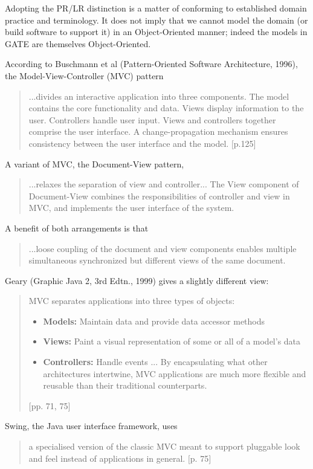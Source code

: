 Adopting the PR/LR distinction is a matter of conforming to established domain
practice and terminology. It does not imply that we cannot model the domain (or
build software to support it) in an Object-Oriented manner; indeed the models
in GATE are themselves Object-Oriented.


According to Buschmann et al
(Pattern-Oriented Software Architecture, 1996),
the Model-View-Controller (MVC)
pattern 
\begin{quotation} 
...divides an interactive application into three components. The model
contains the core functionality and data. Views display information to the
user. Controllers handle user input. Views and controllers together comprise
the user interface. A change-propagation mechanism ensures consistency between
the user interface and the model. \mbox{$[$}p.125\mbox{$]$}\end{quotation}
A variant of MVC, the Document-View pattern, 
\begin{quotation} 
...relaxes the separation of view and controller... The View component of
Document-View combines the responsibilities of controller and view in MVC, and
implements the user interface of the system.\end{quotation}
A benefit of both arrangements is that 
\begin{quotation} 
...loose coupling of the document and view components enables multiple
simultaneous synchronized but different views of the same document.\end{quotation}

Geary (Graphic Java 2, 3rd Edtn., 1999) gives a slightly different view:
\begin{quotation} 
MVC separates applications into three types of objects:
\begin{itemize}
\item 
{\bf Models:} Maintain data and provide data accessor methods
\item 
{\bf Views:} Paint a visual representation of some or all of a model's data
\item 
{\bf Controllers:} Handle events
... By encapsulating what other architectures intertwine, MVC applications are
much more flexible and reusable than their traditional counterparts.
\end{itemize}
\mbox{$[$}pp. 71, 75\mbox{$]$}\end{quotation}
Swing, the Java user interface framework, uses
\begin{quotation} 
a specialised version of the classic MVC meant to support pluggable look and
feel instead of applications in general.
\mbox{$[$}p. 75\mbox{$]$}\end{quotation}

